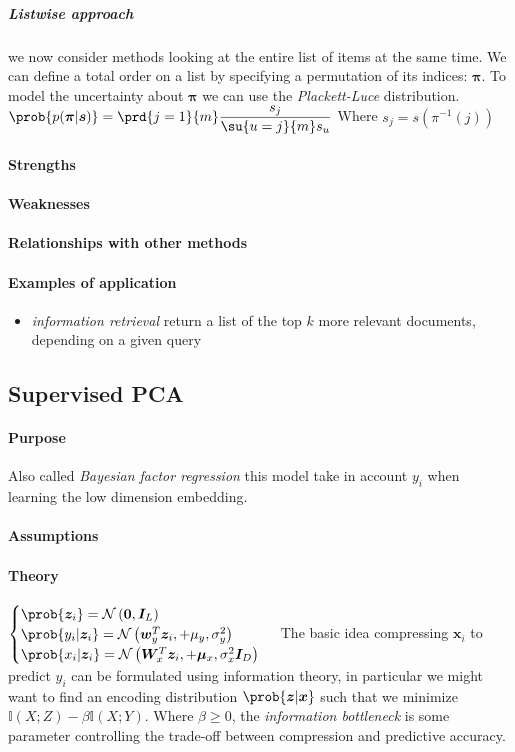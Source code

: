 \subparagraph{Listwise approach}
we now consider methods looking at the entire list of items at the same time. We can 
define a total order on a list by specifying a permutation of its indices: $\bm{\pi}$.
To model the uncertainty about $\bm{\pi}$ we can use the \emph{Plackett-Luce} 
distribution. $\prob{p(\bm{\pi}|\bm{s})} = \prd{j=1}{m}\dfrac{s_{j}}{\su{u=j}{m}s_{u}}$
Where $s_{j}=s\left(\pi^{-1}(j)\right)$
\paragraph{Strengths}
\paragraph{Weaknesses}
\paragraph{Relationships with other methods}
\paragraph{Examples of application}
\begin{itemize}
    \item \emph{information retrieval} return a list of the top $k$ more relevant 
        documents, depending on a given query 
\end{itemize}

\subsection{Supervised PCA}
\paragraph{Purpose}
Also called \emph{Bayesian factor regression} this model take in account $y_{i}$ when
learning the low dimension embedding.
\paragraph{Assumptions}
\paragraph{Theory}
$\begin{cases}
    \prob{\bm{z}_{i}} = \mathcal{N}\left(\bm{0}, \bm{I}_{L}\right) \\
    \prob{y_{i}|\bm{z}_{i}} = \mathcal{N}\left(\bm{w}_{y}^{T}\bm{z}_{i},
    +\mu_{y},\sigma_{y}^{2}\right) \\
    \prob{x_{i}|\bm{z}_{i}} = \mathcal{N}\left(\bm{W}_{x}^{T}\bm{z}_{i},
    +\bm{\mu}_{x},\sigma_{x}^{2}\bm{I}_{D}\right)
\end{cases}$
The basic idea compressing $\bm{x}_{i}$ to predict $y_{i}$ can be formulated using
information theory, in particular we might want to find an encoding distribution
$\prob{\bm{z}|\bm{x}}$ such that we minimize $\mathbb{I}(X;Z) - \beta\mathbb{I}(X;Y)$.
Where $\beta\geq 0$, the \emph{information bottleneck} is some parameter controlling 
the trade-off between compression and predictive accuracy.
